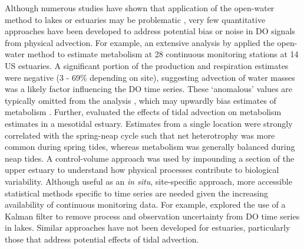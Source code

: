 \documentclass[letterpaper,12pt,oneside]{article}\usepackage[]{graphicx}\usepackage[]{color}
\begin{document}
Although numerous studies have shown that application of the open-water method to lakes or estuaries may be problematic \citep{Ziegler98,Caffrey03,Coloso11,Batt12,Nidzieko14}, very few quantitative approaches have been developed to address potential bias or noise in \ac{DO} signals from physical advection.  For example, an extensive analysis by \citet{Caffrey03} applied the open-water method to estimate metabolism at 28 continuous monitoring stations at 14 US estuaries.  A significant portion of the production and respiration estimates were negative (3 - 69\% depending on site), suggesting advection of water masses was a likely factor influencing the \ac{DO} time series.  These `anomalous' values are typically omitted from the analysis \citep{Caffrey03,Collins13}, which may upwardly bias estimates of metabolism \citep{Murrell13}.  Further, \citet{Nidzieko14} evaluated the effects of tidal advection on metabolism estimates in a mesotidal estuary.  Estimates from a single location were strongly correlated with the spring-neap cycle such that net heterotrophy was more common during spring tides, whereas metabolism was generally balanced during neap tides.  A control-volume approach was used by impounding a section of the upper estuary to understand how physical processes contribute to biological variability.  Although useful as an \textit{in situ}, site-specific approach, more accessible statistical methods specific to time series are needed given the increasing availability of continuous monitoring data. For example, \citet{Batt12} explored the use of a Kalman filter \citep{Harvey89} to remove process and observation uncertainty from \ac{DO} time series in lakes.  Similar approaches have not been developed for estuaries, particularly those that address potential effects of tidal advection.
\end{document}
